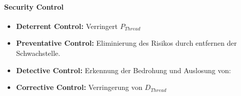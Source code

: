 \paragraph{Security Control}
\begin{itemize}
	\item \textbf{Deterrent Control:} Verringert $P_{Thread}$
	\item \textbf{Preventative Control:} Eliminierung des Risikos durch entfernen der Schwachstelle.
	\item \textbf{Detective Control:} Erkennung der Bedrohung und Auslosung von:
	\item \textbf{Corrective Control:} Verringerung von $D_{Thread}$
\end{itemize}
 







